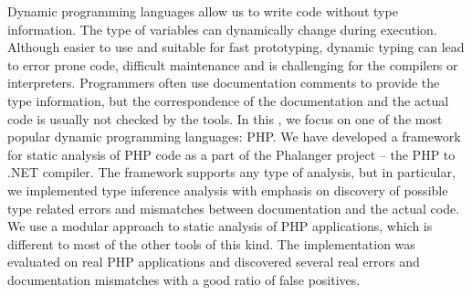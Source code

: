 Dynamic programming languages allow us to write code without type 
information. The type of variables can dynamically 
change during execution. Although easier to use 
and suitable for fast prototyping, dynamic typing 
can lead to error prone code, difficult maintenance 
and is challenging for the compilers or interpreters.
Programmers often use documentation comments to provide 
the type information, but the correspondence of the 
documentation and the actual code is usually not checked 
by the tools. In this \wthesis, we focus on one of the most popular dynamic 
programming languages: PHP. We have developed a framework 
for static analysis of PHP code as a part of the Phalanger project -- 
the PHP to .NET compiler. The framework supports any type of analysis, 
but in particular, we implemented type inference analysis with emphasis 
on discovery of possible type related errors and mismatches between 
documentation and the actual code. We use a modular approach to 
static analysis of PHP applications, which is different to most 
of the other tools of this kind. The implementation was evaluated 
on real PHP applications and discovered several real errors and 
documentation mismatches with a good ratio of false positives.
